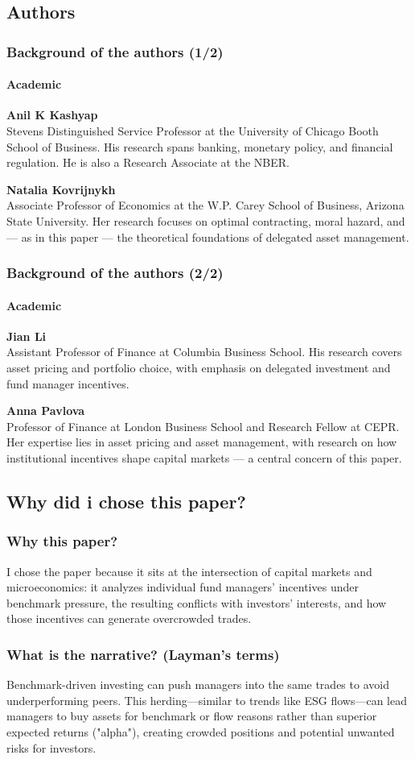 \documentclass{beamer} %
\begin{document}
	\subsection{Authors}
\begin{frame}[fragile]
	\frametitle{Background of the authors (1/2)}
	\framesubtitle{Academic}
	\textbf{Anil K Kashyap} \\
	Stevens Distinguished Service Professor at the University of Chicago Booth School of Business. His research spans banking, monetary policy, and financial regulation. He is also a Research Associate at the NBER.
	
	\vspace{1em}
	\textbf{Natalia Kovrijnykh}\\
	Associate Professor of Economics at the W.P. Carey School of Business, Arizona State University. Her research focuses on optimal contracting, moral hazard, and — as in this paper — the theoretical foundations of delegated asset management.
\end{frame}

\begin{frame}[fragile]
	\frametitle{Background of the authors (2/2)}
	\framesubtitle{Academic}
	\vspace{1em}
	\textbf{Jian Li}\\
	Assistant Professor of Finance at Columbia Business School. His research covers asset pricing and portfolio choice, with emphasis on delegated investment and fund manager incentives.
	
	\vspace{1em}
	\textbf{Anna Pavlova}\\
	Professor of Finance at London Business School and Research Fellow at CEPR. Her expertise lies in asset pricing and asset management, with research on how institutional incentives shape capital markets — a central concern of this paper.
\end{frame}
	
	\subsection{Why did i chose this paper?}
	\begin{frame} \frametitle{Why this paper?} 
		I chose the paper because it sits at the intersection of capital markets and microeconomics: it analyzes individual fund managers' incentives under benchmark pressure, the resulting conflicts with investors' interests, and how those incentives can generate overcrowded trades. 
	\end{frame}
	\begin{frame} 
		\frametitle{What is the narrative? (Layman's terms)} 
		Benchmark-driven investing can push managers into the same trades to avoid underperforming peers. This herding—similar to trends like ESG flows—can lead managers to buy assets for benchmark or flow reasons rather than superior expected returns ("alpha"), creating crowded positions and potential unwanted risks for investors. 
	\end{frame}	
	
\end{document}
